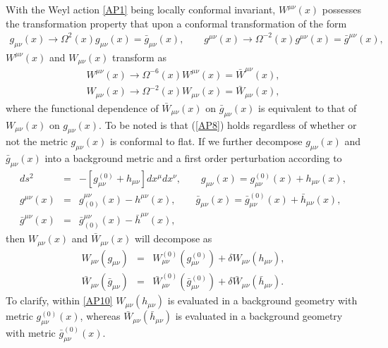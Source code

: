 With the Weyl action \eqref{AP1} being locally conformal invariant, $W^{\mu\nu}(x)$ possesses the transformation property that upon a conformal transformation of the form
%
\begin{eqnarray}
g_{\mu\nu}(x)\rightarrow \Omega^2(x) g_{\mu\nu}(x)=\bar{g}_{\mu\nu}(x),\qquad
g^{\mu\nu}(x)\rightarrow \Omega^{-2}(x) g^{\mu\nu}(x)=\bar{g}^{\mu\nu}(x),
\label{AP7}
\end{eqnarray}
% 
$W^{\mu\nu}(x)$ and $W_{\mu\nu}(x)$ transform as 
%
\begin{eqnarray}
W^{\mu\nu}(x)\rightarrow \Omega^{-6}(x) W^{\mu\nu}(x)=\bar{W}^{\mu\nu}(x),
\nonumber\\
W_{\mu\nu}(x)\rightarrow \Omega^{-2}(x) W_{\mu\nu}(x)=\bar{W}_{\mu\nu}(x),
\label{AP8}
\end{eqnarray}
%
where the functional dependence of $\bar{W}_{\mu\nu}(x)$ on $\bar{g}_{\mu\nu}(x)$ is equivalent to that of
$W_{\mu\nu}(x)$ on $g_{\mu\nu}(x)$. To be noted is that (\ref{AP8}) holds regardless of whether or not the metric $g_{\mu\nu}(x)$ is conformal to flat. If we further decompose $g_{\mu\nu}(x)$ and $\bar{g}_{\mu\nu}(x)$ into a background metric and a first order perturbation according to
%
\begin{eqnarray}
ds^2&=&-[g^{(0)}_{\mu\nu}+h_{\mu\nu}]dx^{\mu}dx^{\nu},\qquad g_{\mu\nu}(x)=g^{(0)}_{\mu\nu}(x)+h_{\mu\nu}(x),
\nonumber\\ 
g^{\mu\nu}(x)&=&g_{(0)}^{\mu\nu}(x)-h^{\mu\nu}(x),\qquad
\bar{g}_{\mu\nu}(x)=\bar{g}^{(0)}_{\mu\nu}(x)+\bar{h}_{\mu\nu}(x),
\nonumber\\
\bar{g}^{\mu\nu}(x)&=&\bar{g}_{(0)}^{\mu\nu}(x)-\bar{h}^{\mu\nu}(x),
\label{AP9}
\end{eqnarray}
% 
then $W_{\mu\nu}(x)$ and $\bar{W}_{\mu\nu}(x)$ will decompose as 
%
\begin{eqnarray}
W_{\mu\nu}(g_{\mu\nu})&=& W^{(0)}_{\mu\nu}(g^{(0)}_{\mu\nu})+\delta W_{\mu\nu}(h_{\mu\nu}),
\nonumber\\
\bar{W}_{\mu\nu}(\bar{g}_{\mu\nu})&=&\bar{W}^{(0)}_{\mu\nu}(\bar{g}^{(0)}_{\mu\nu})+\delta \bar{W}_{\mu\nu}(\bar{h}_{\mu\nu}).
\label{AP10}
\end{eqnarray}
%
To clarify, within \eqref{AP10} $W_{\mu\nu}(h_{\mu\nu})$ is evaluated in a background geometry with metric $g^{(0)}_{\mu\nu}(x)$, whereas $\bar{W}_{\mu\nu}(\bar{h}_{\mu\nu})$ is evaluated in a background geometry with metric $\bar{g}^{(0)}_{\mu\nu}(x)$. 


